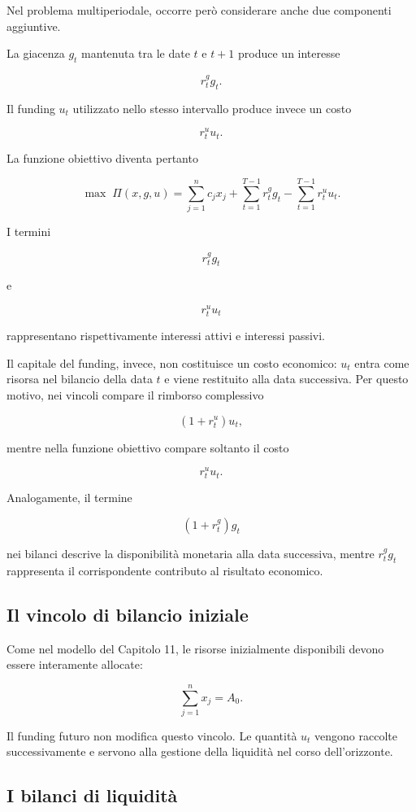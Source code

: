 Nel problema multiperiodale, occorre per\`o considerare anche due componenti
aggiuntive.

La giacenza $g_t$ mantenuta tra le date $t$ e $t+1$ produce un interesse

\[
r^g_tg_t.
\]

Il funding $u_t$ utilizzato nello stesso intervallo produce invece un costo

\[
r^u_tu_t.
\]

La funzione obiettivo diventa pertanto

\[
\max\;
\Pi(x,g,u)
=
\sum_{j=1}^{n}c_jx_j
+
\sum_{t=1}^{T-1}r^g_tg_t
-
\sum_{t=1}^{T-1}r^u_tu_t.
\]

I termini

\[
r^g_tg_t
\]

e

\[
r^u_tu_t
\]

\noindent rappresentano rispettivamente interessi attivi e interessi passivi.

Il capitale del funding, invece, non costituisce un costo economico: $u_t$
entra come risorsa nel bilancio della data $t$ e viene restituito alla data
successiva. Per questo motivo, nei vincoli compare il rimborso complessivo

\[
(1+r^u_t)u_t,
\]

\noindent mentre nella funzione obiettivo compare soltanto il costo

\[
r^u_tu_t.
\]

Analogamente, il termine

\[
(1+r^g_t)g_t
\]

\noindent nei bilanci descrive la disponibilit\`a monetaria alla data successiva,
mentre $r^g_tg_t$ rappresenta il corrispondente contributo al risultato
economico.

\subsection{Il vincolo di bilancio iniziale}

Come nel modello del Capitolo 11, le risorse inizialmente disponibili devono
essere interamente allocate:

\[
\sum_{j=1}^{n}x_j
=
A_0.
\]

Il funding futuro non modifica questo vincolo. Le quantit\`a $u_t$ vengono
raccolte successivamente e servono alla gestione della liquidit\`a nel corso
dell'orizzonte.

\subsection{I bilanci di liquidit\`a}

